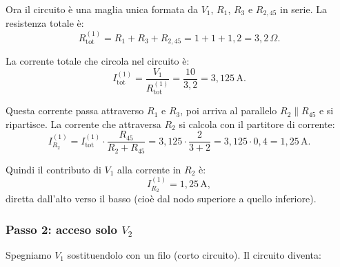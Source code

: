 \begin{esempio}
\begin{center}
\end{center}

Ora il circuito è una maglia unica formata da \(V_1\), \(R_1\), \(R_3\) e \(R_{2,45}\) in serie. La resistenza totale è:
\[
R_{\text{tot}}^{(1)} = R_1 + R_3 + R_{2,45} = 1 + 1 + 1{,}2 = 3{,}2\,\Omega.
\]

La corrente totale che circola nel circuito è:
\[
I_{\text{tot}}^{(1)} = \frac{V_1}{R_{\text{tot}}^{(1)}} = \frac{10}{3{,}2} = 3{,}125\,\text{A}.
\]

Questa corrente passa attraverso \(R_1\) e \(R_3\), poi arriva al parallelo \(R_2 \parallel R_{45}\) e si ripartisce. La corrente che attraversa \(R_2\) si calcola con il partitore di corrente:
\[
I_{R_2}^{(1)} = I_{\text{tot}}^{(1)} \cdot \frac{R_{45}}{R_2 + R_{45}} = 3{,}125 \cdot \frac{2}{3 + 2} = 3{,}125 \cdot 0{,}4 = 1{,}25\,\text{A}.
\]

Quindi il contributo di \(V_1\) alla corrente in \(R_2\) è:
\[
I_{R_2}^{(1)} = 1{,}25\,\text{A},
\]
diretta dall'alto verso il basso (cioè dal nodo superiore a quello inferiore).

\subsubsection*{Passo 2: acceso solo \(V_2\)}

Spegniamo \(V_1\) sostituendolo con un filo (corto circuito). Il circuito diventa:

\begin{center}
\end{center}
\end{esempio}
